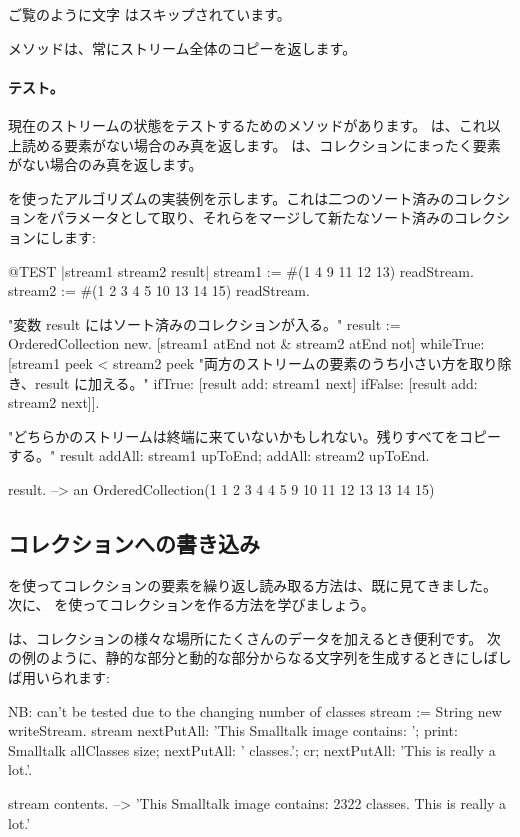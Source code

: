\documentclass[a4paper,10pt,twoside]{book}
\begin{document}
ご覧のように文字  はスキップされています。

 メソッドは、常にストリーム全体のコピーを返します。

\paragraph{テスト。}現在のストリームの状態をテストするためのメソッドがあります。
 は、これ以上読める要素がない場合のみ真を返します。
 は、コレクションにまったく要素がない場合のみ真を返します。

 を使ったアルゴリズムの実装例を示します。これは二つのソート済みのコレクションをパラメータとして取り、それらをマージして新たなソート済みのコレクションにします:

\begin{code}{@TEST |stream1 stream2 result|}
stream1 := #(1 4 9 11 12 13) readStream.
stream2 := #(1 2 3 4 5 10 13 14 15) readStream.

"変数 result にはソート済みのコレクションが入る。"
result := OrderedCollection new.
[stream1 atEnd not & stream2 atEnd not]
  whileTrue: [stream1 peek < stream2 peek
    "両方のストリームの要素のうち小さい方を取り除き、result に加える。"
    ifTrue: [result add: stream1 next]
    ifFalse: [result add: stream2 next]].

"どちらかのストリームは終端に来ていないかもしれない。残りすべてをコピーする。"
result
  addAll: stream1 upToEnd;
  addAll: stream2 upToEnd.

result. -->   an OrderedCollection(1 1 2 3 4 4 5 9 10 11 12 13 13 14 15)
\end{code}

\subsection{コレクションへの書き込み}

 を使ってコレクションの要素を繰り返し読み取る方法は、既に見てきました。
次に、 を使ってコレクションを作る方法を学びましょう。

 は、コレクションの様々な場所にたくさんのデータを加えるとき便利です。
次の例のように、静的な部分と動的な部分からなる文字列を生成するときにしばしば用いられます:

\begin{code}{NB: can't be tested due to the changing number of classes}
stream := String new writeStream.
stream
  nextPutAll: 'This Smalltalk image contains: ';
  print: Smalltalk allClasses size;
  nextPutAll: ' classes.';
  cr;
  nextPutAll: 'This is really a lot.'.

stream contents. --> 'This Smalltalk image contains: 2322 classes.
This is really a lot.'
\end{code}
\end{document}

